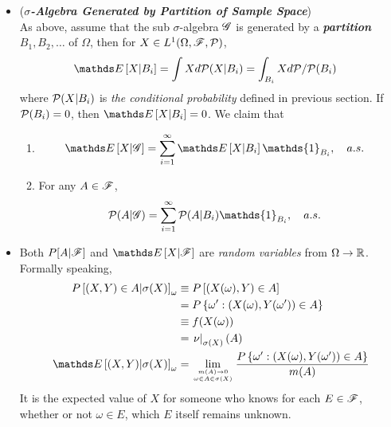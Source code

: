 \documentclass[11pt]{article}
\begin{document}
\begin{itemize}
\item \begin{remark}(\emph{\textbf{$\sigma$-Algebra Generated by Partition of Sample Space}})\\
As above, assume that the sub $\sigma$-algebra ${\mathscr G}$ is generated by a \emph{\textbf{partition}} $B_1, B_2, \ldots$ of $\Omega$, then for $X \in L^1(\Omega, {\mathscr F}, {\mathcal P})$, 
\begin{align*}
\E{}{X | B_i} &= \int X d\cP(X | B_i) = \int_{B_i} X d\cP / \cP(B_i)
\end{align*} where ${\mathcal P}(X | B_i)$ is \emph{the conditional probability} defined in previous section. If ${\mathcal P}(B_i) = 0$, then $\E{}{X | B_i} = 0$.
We claim that 
\begin{enumerate}
\item 
\begin{align*}
\E{}{X | \srG} &= \sum_{i=1}^{\infty}\E{}{X | B_i} \mathds{1}_{B_i}, \quad a.s.
\end{align*}
\item For any $A \in {\mathscr F}$,
\begin{align*}
\cP(A | \srG) &= \sum_{i=1}^{\infty}\cP(A | B_i) \mathds{1}_{B_i}, \quad a.s.
\end{align*}
\end{enumerate}
\end{remark}



\item \begin{remark}
Both $P[A | {\mathscr F}]$ and $\E{}{X| \srF}$ are \emph{random variables} from $\Omega \rightarrow {\mathbb R}$. Formally speaking, 
\begin{align*}
P\brac{(X,Y)\in A| \sigma(X)}_{\omega} &\equiv P\brac{(X(\omega), Y)\in A}\\
&= P\set{\omega': (X(\omega), Y(\omega'))\in A}\\
&\equiv f(X(\omega))\\
&= \rlat{\nu}{\sigma(X)}(A)\\
\E{}{(X,Y)| \sigma(X)}_{\omega} &= \lim\limits_{m(A)\rightarrow 0\atop \omega\in A\in \sigma(X)} \frac{P\set{\omega': (X(\omega), Y(\omega'))\in A}}{m(A)}
\end{align*}
It is the expected value of $X$ for someone who knows for each $E\in {\mathscr F}$, whether or not $\omega\in E$, which $E$ itself remains unknown.
\end{remark}
\end{itemize}
\end{document}

